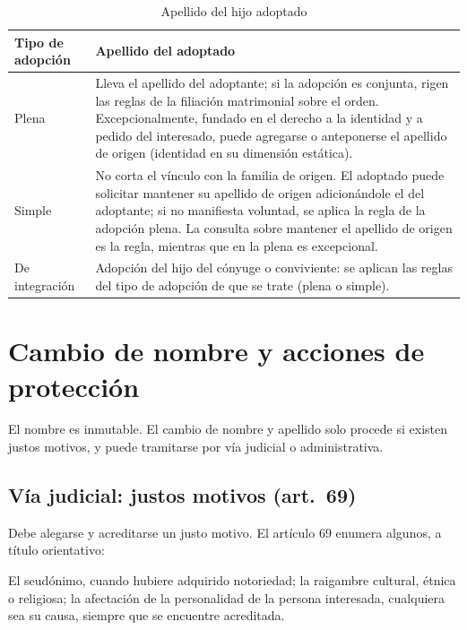 \documentclass[12pt,oneside]{book}
\begin{document}
\begin{table}[H]
\centering
\begin{tabularx}{\textwidth}{B{0.22\textwidth} Y}
\toprule
\textbf{Tipo de adopción} & \textbf{Apellido del adoptado} \\
\midrule
Plena & Lleva el apellido del adoptante; si la adopción es conjunta, rigen las reglas de la filiación matrimonial sobre el orden. Excepcionalmente, fundado en el derecho a la identidad y a pedido del interesado, puede agregarse o anteponerse el apellido de origen (identidad en su dimensión estática). \\
Simple & No corta el vínculo con la familia de origen. El adoptado puede solicitar mantener su apellido de origen adicionándole el del adoptante; si no manifiesta voluntad, se aplica la regla de la adopción plena. La consulta sobre mantener el apellido de origen es la regla, mientras que en la plena es excepcional. \\
De integración & Adopción del hijo del cónyuge o conviviente: se aplican las reglas del tipo de adopción de que se trate (plena o simple). \\
\bottomrule
\end{tabularx}
\caption{Apellido del hijo adoptado}
\end{table}

\section{Cambio de nombre y acciones de protección}

\begin{importante}
El nombre es inmutable. El cambio de nombre y apellido solo procede si existen justos motivos, y puede tramitarse por vía judicial o administrativa.
\end{importante}

\subsection{Vía judicial: justos motivos (art.~69)}

Debe alegarse y acreditarse un justo motivo. El artículo 69 enumera algunos, a título orientativo:

\begin{regla}
El seudónimo, cuando hubiere adquirido notoriedad; la raigambre cultural, étnica o religiosa; la afectación de la personalidad de la persona interesada, cualquiera sea su causa, siempre que se encuentre acreditada.
\end{regla}
\end{document}
